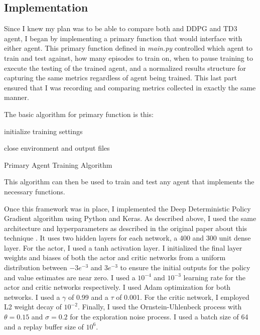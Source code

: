 \documentclass{article}
\begin{document}
\subsection{Implementation}
Since I knew my plan was to be able to compare both and DDPG and TD3 agent, I began by implementing a primary function that would interface with either agent. This primary function defined in \textit{main.py} controlled which agent to train and test against, how many episodes to train on, when to pause training to execute the testing of the trained agent, and a normalized results structure for capturing the same metrics regardless of agent being trained. This last part ensured that I was recording and comparing metrics collected in exactly the same manner. 

The basic algorithm for primary function is this:

\begin{algorithm}[H]
\SetAlgoLined

initialize training settings\;


close environment and output files\;

\caption{Primary Agent Training Algorithm}
\end{algorithm}

This algorithm can then be used to train and test any agent that implements the necessary functions. 

Once this framework was in place, I implemented the Deep Deterministic Policy Gradient algorithm using Python and Keras. As described above, I used the same architecture and hyperparameters as described in the original paper about this technique \cite{DBLP:journals/corr/LillicrapHPHETS15}. It uses two hidden layers for each network, a 400 and 300 unit dense layer. For the actor, I used a tanh activation layer. I initialized the final layer weights and biases of both the actor and critic networks from a uniform distribution between $-3e^{-3}$ and $3e^{-3}$ to ensure the initial outputs for the policy and value estimates are near zero. I used a $10^{-4}$ and $10^{-3}$ learning rate for the actor and critic networks respectively. I used Adam optimization for both networks. I used a $\gamma$ of 0.99 and a $\tau$ of 0.001. For the critic network, I employed L2 weight decay of $10^{-2}$. Finally, I used the Ornstein-Uhlenbeck process with $\theta = 0.15$ and $\sigma = 0.2$ for the exploration noise process. I used a batch size of 64 and a replay buffer size of $10^{6}$. 
\end{document}
